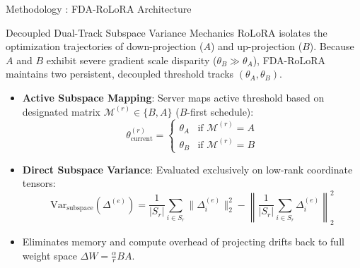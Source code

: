 \documentclass[aspectratio=169]{beamer}
\begin{document}
\begin{frame}{Methodology : FDA-RoLoRA Architecture}
    \vspace{-0.3em}
    \begin{block}{Decoupled Dual-Track Subspace Variance Mechanics}
        \footnotesize
        RoLoRA isolates the optimization trajectories of down-projection ($A$) and up-projection ($B$). Because $A$ and $B$ exhibit severe gradient scale disparity ($\theta_B \gg \theta_A$), FDA-RoLoRA maintains two persistent, decoupled threshold tracks $(\theta_A, \theta_B)$.
    \end{block}
    
    \footnotesize
    \begin{itemize}
        \item \textbf{Active Subspace Mapping}: Server maps active threshold based on designated matrix $\mathcal{M}^{(r)} \in \{B, A\}$ ($B$-first schedule):
        $$\theta_{\text{current}}^{(r)} = \begin{cases} \theta_A & \text{if } \mathcal{M}^{(r)} = A \\ \theta_B & \text{if } \mathcal{M}^{(r)} = B \end{cases}$$
        \item \textbf{Direct Subspace Variance}: Evaluated exclusively on low-rank coordinate tensors:
        $$\text{Var}_{\text{subspace}}(\Delta^{(e)}) = \frac{1}{|S_r|} \sum_{i \in S_r} \|\Delta_i^{(e)}\|_2^2 - \left\| \frac{1}{|S_r|} \sum_{i \in S_r} \Delta_i^{(e)} \right\|_2^2$$
        \item Eliminates memory and compute overhead of projecting drifts back to full weight space $\Delta W = \frac{\alpha}{r}BA$.
    \end{itemize}
\end{frame}
\end{document}
